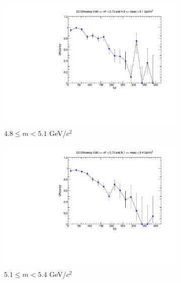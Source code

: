 \begin{figure}[p]
\begin{subfigure}[b]{0.32\textwidth}
        \centering
        \includegraphics[width=\textwidth]{./kTrackerEfficiencyPlots/D2_Efficiency_xF13_mass2.pdf}
        \caption{$4.8 \leq m < 5.1$ GeV/$c^2$}
        \label{fig:xF13_mass2}
    \end{subfigure}
    \vspace{0.5cm}
    \begin{subfigure}[b]{0.32\textwidth}
        \centering
        \includegraphics[width=\textwidth]{./kTrackerEfficiencyPlots/D2_Efficiency_xF13_mass3.pdf}
        \caption{$5.1 \leq m < 5.4$ GeV/$c^2$}
        \label{fig:xF13_mass3}
    \end{subfigure}
    \hfill
    \begin{subfigure}[b]{0.32\textwidth}
        \centering

\end{subfigure}
\end{figure}
